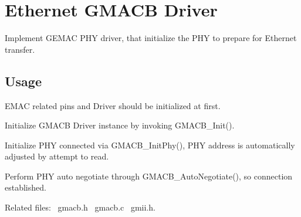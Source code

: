 \hypertarget{group__gmacb__module}{}\section{Ethernet G\+M\+A\+CB Driver}
\label{group__gmacb__module}
Implement G\+E\+M\+AC P\+HY driver, that initialize the P\+HY to prepare for Ethernet transfer.\hypertarget{group__RTEMSBSPsARM_Usage}{}\subsection{Usage}\label{group__RTEMSBSPsARM_Usage}

\begin{DoxyEnumerate}
\item E\+M\+AC related pins and Driver should be initialized at first.
\item Initialize G\+M\+A\+CB Driver instance by invoking G\+M\+A\+C\+B\+\_\+\+Init().
\item Initialize P\+HY connected via G\+M\+A\+C\+B\+\_\+\+Init\+Phy(), P\+HY address is automatically adjusted by attempt to read.
\item Perform P\+HY auto negotiate through G\+M\+A\+C\+B\+\_\+\+Auto\+Negotiate(), so connection established.
\end{DoxyEnumerate}

Related files\+:~\newline
 gmacb.\+h~\newline
 gmacb.\+c~\newline
 gmii.\+h.~\newline
 